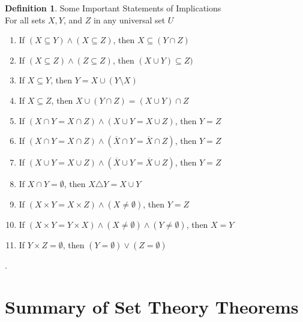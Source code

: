 \documentclass{book}
\theoremstyle{definition}
\newtheorem{definition}{Definition}[section]
\theoremstyle{remark}
\begin{document}
\newpage
\begin{definition}
Some Important Statements of Implications \\

For all sets $X, Y$, and $Z$ in any universal set $U$ \\

    \begin{enumerate}
        \item If $(X \subseteq Y) \wedge (X \subseteq Z)$, then $X \subseteq (Y \cap Z)$
        \item If $(X \subseteq Z) \wedge (Z \subseteq Z)$, then $(X \cup Y) \subseteq Z)$
        \item If $X \subseteq Y$, then $Y = X \cup (Y \setminus X)$
        \item If $X \subseteq Z$, then $X \cup (Y \cap Z) = (X \cup Y) \cap Z$
        \item If $(X \cap Y = X \cap Z) \wedge (X \cup Y = X \cup Z)$, then $Y = Z$
        \item If $(X \cap Y = X \cap Z) \wedge (\overline{X} \cap Y = \overline{X} \cap Z)$, then $Y = Z$
        \item If $(X \cup Y = X \cup Z) \wedge (\overline{X} \cup Y = \overline{X} \cup Z)$, then $Y = Z$
        \item If $X \cap Y = \emptyset$, then $X \triangle Y = X \cup Y$
        \item If $(X \times Y = X \times Z) \wedge (X \neq \emptyset)$, then $Y = Z$
        \item If $(X \times Y = Y \times X) \wedge (X \neq \emptyset) \wedge (Y \neq \emptyset)$, then $X = Y$
        \item If $Y \times Z = \emptyset$, then $(Y = \emptyset) \vee (Z = \emptyset)$
    \end{enumerate}
\end{definition}




\newpage.
\section{Summary of Set Theory Theorems}
\end{document}

